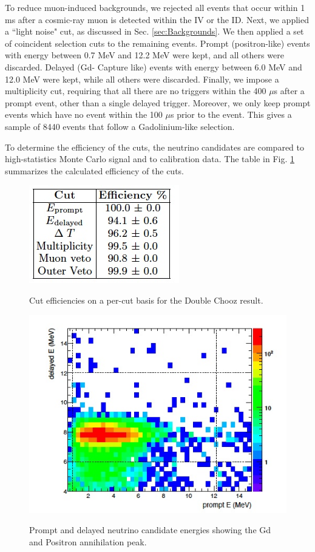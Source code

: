  To reduce muon-induced backgrounds, we rejected all events that occur within 1 ms after a cosmic-ray muon is detected within the IV or the ID. Next, we applied a ``light noise" cut,  as discussed in Sec. \ref{sec:Backgrounds}. We then applied a set of coincident selection cuts to the remaining events. Prompt (positron-like) events with energy between 0.7 MeV and 12.2 MeV were kept, and all others were discarded.  Delayed (Gd- Capture like) events with energy between 6.0 MeV and 12.0 MeV were kept, while all others were discarded. Finally, we impose a multiplicity cut, requiring that all there are no triggers within the 400 $\mu$s after a prompt event, other than a single delayed trigger. Moreover, we only keep prompt events which have no event within the 100 $\mu$s prior to the event.  This gives a sample of 8440 events that follow a Gadolinium-like selection. 
 
 To determine the efficiency of the cuts, the neutrino candidates are compared to high-statistics Monte Carlo signal and to calibration data. The table in Fig. \ref{Cut_Summary} summarizes the calculated efficiency of the cuts. 
 
 \begin{figure}
 \caption{Cut efficiencies on a per-cut basis for the Double Chooz result.}
 \includegraphics[width =.5 \textwidth]{DC_Results/Cut_Summary.jpg}
 \label{Cut_Summary}
 \end{figure}
 
 
 \begin{figure}
 \caption{Prompt and delayed neutrino candidate energies showing the Gd and Positron annihilation peak.}
 \includegraphics[width = .5 \textwidth] {DC_Results/Prompt_Delayed.jpg}
 \label{PromptDelay}
 \end{figure}
 
